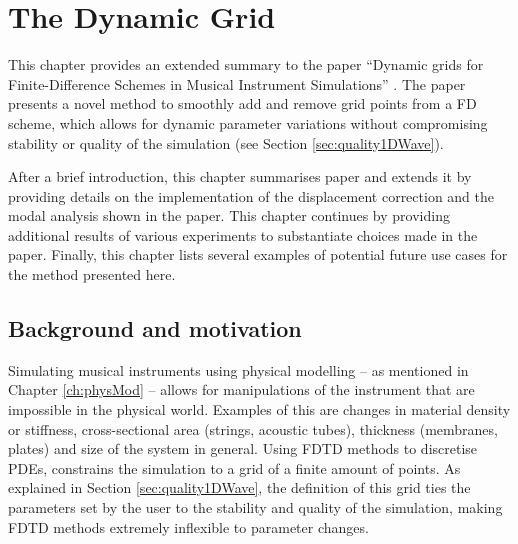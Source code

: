 \chapter{The Dynamic Grid}\label{ch:dynamicGrid}
This chapter provides an extended summary to the paper ``Dynamic grids for Finite-Difference Schemes in Musical Instrument Simulations'' \citeP[G]. The paper presents a novel method to smoothly add and remove grid points from a FD scheme, which allows for dynamic parameter variations without compromising stability or quality of the simulation (see Section \ref{sec:quality1DWave}). 

After a brief introduction, this chapter summarises paper \citeP[G] and extends it by providing details on the implementation of the displacement correction and the modal analysis shown in the paper. This chapter continues by providing additional results of various experiments to substantiate choices made in the paper. Finally, this chapter lists several examples of potential future use cases for the method presented here. 

\section{Background and motivation}
Simulating musical instruments using physical modelling -- as mentioned in Chapter \ref{ch:physMod} -- allows for manipulations of the instrument that are impossible in the physical world. Examples of this are changes in material density or stiffness, cross-sectional area (strings, acoustic tubes), thickness (membranes, plates) and size of the system in general. Using FDTD methods to discretise PDEs, constrains the simulation to a grid of a finite amount of points. As explained in Section \ref{sec:quality1DWave}, the definition of this grid ties the parameters set by the user to the stability and quality of the simulation, making FDTD methods extremely inflexible to parameter changes. 

